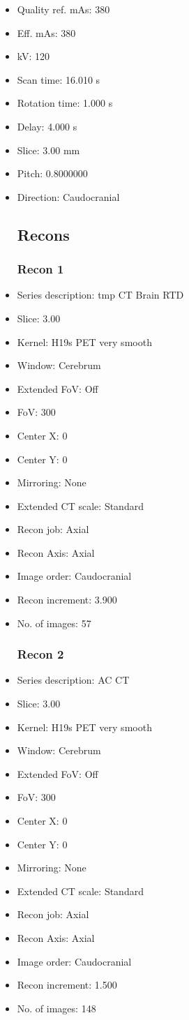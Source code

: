 \documentclass[12pt]{article}
\begin{document}
\begin{itemize}[noitemsep]
\subsection{Scan}
\item Quality ref. mAs: 380\item Eff. mAs: 380\item kV: 120\item Scan time: 16.010 s\item Rotation time: 1.000 s\item Delay: 4.000 s\item Slice: 3.00 mm\item Pitch: 0.8000000\item Direction: Caudocranial\subsection{Recons}

\subsubsection{Recon 1}
\item Series description: tmp CT Brain RTD
\item Slice: 3.00
\item Kernel: H19s PET very smooth
\item Window: Cerebrum
\item Extended FoV: Off
\item FoV: 300
\item Center X: 0
\item Center Y: 0
\item Mirroring: None
\item Extended CT scale: Standard
\item Recon job: Axial
\item Recon Axis: Axial
\item Image order: Caudocranial
\item Recon increment: 3.900
\item No. of images: 57
\subsubsection{Recon 2}
\item Series description: AC CT
\item Slice: 3.00
\item Kernel: H19s PET very smooth
\item Window: Cerebrum
\item Extended FoV: Off
\item FoV: 300
\item Center X: 0
\item Center Y: 0
\item Mirroring: None
\item Extended CT scale: Standard
\item Recon job: Axial
\item Recon Axis: Axial
\item Image order: Caudocranial
\item Recon increment: 1.500
\item No. of images: 148

\end{itemize}
\end{document}
